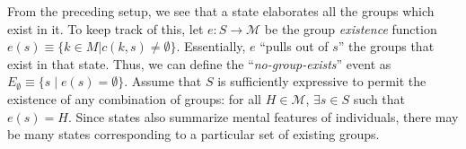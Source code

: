 \documentclass[
11pt,
titlepage,
reqno,
]{article}%
\theoremstyle{definition}
\begin{document}
	From the preceding setup, we see that a state elaborates all the groups which exist in it. To keep track of this, let $e:S \rightarrow \mathcal{M}$ be the group \textit{existence} function  $e(s)\equiv\{k\in M|c(k,s)\ne \emptyset\}$.  Essentially, $e$  ``pulls out of $s$'' the groups that exist in that state.   Thus, we can define the ``\textit{no-group-exists}'' event as   $E_\emptyset\equiv\{s\mid e(s)=\emptyset\}$. Assume that $S$ is sufficiently expressive to permit the existence of any combination of groups: for all $H\in\mathcal{M}$, $\exists s\in S$ such that $e(s)=H$. Since states also summarize mental features of individuals, there may be many states corresponding to a particular set of existing groups. %
	
	
	
	
	
\end{document}
